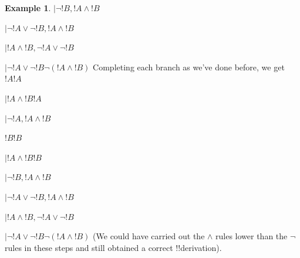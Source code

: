 \documentclass[10pt,a4paper]{article}
\theoremstyle{plain}
\theoremstyle{definition}
\newtheorem{ex}[thm]{Example}
\theoremstyle{remark}
\providecommand{\AxiomC}[1]{}
\providecommand{\RightLabel}[1]{}
\providecommand{\fCenter}{}
\newenvironment{prooftree}{}{}
\providecommand{\LeftR}[1]{}
\providecommand{\RightR}[1]{}
\providecommand{\UnaryInf}{\ensuremath{\mid}}
\providecommand{\BinaryInf}{\ensuremath{\mid}}
\providecommand{\RightR}{\mathrm{R}}
\providecommand{\LeftR}{\mathrm{L}}
\providecommand{\Axiom}{\mathrm{Ax}}
\begin{document}
\begin{ex}
\begin{prooftree}
\AxiomC{}
\UnaryInf$\lnot !B, !A \land !B \fCenter $

\RightLabel{\LeftR{\lor}}
\BinaryInf$\lnot !A \lor \lnot !B, !A \land !B \fCenter $
\RightLabel{\LeftR{\Exchange}}
\UnaryInf$!A \land !B, \lnot !A \lor \lnot !B \fCenter $
\RightLabel{\RightR{\lnot}}
\UnaryInf$\lnot !A \lor \lnot !B \fCenter \lnot (!A \land !B)$
\end{prooftree}
Completing each branch as we've done before, we get
\begin{prooftree}
\Axiom$ !A \fCenter!A$
\RightLabel{\LeftR{\land}}
\UnaryInf$!A \land !B \fCenter !A$
\RightLabel{\LeftR{\lnot}}
\UnaryInf$\lnot !A, !A \land !B \fCenter $

\Axiom$ !B \fCenter !B$
\RightLabel{\LeftR{\land}}
\UnaryInf$!A \land !B \fCenter !B$
\RightLabel{\LeftR{\lnot}}
\UnaryInf$\lnot !B, !A \land !B \fCenter $

\RightLabel{\LeftR{\lor}}
\BinaryInf$\lnot !A \lor \lnot !B, !A \land !B \fCenter $
\RightLabel{\LeftR{\Exchange}}
\UnaryInf$!A \land !B, \lnot !A \lor \lnot !B \fCenter $
\RightLabel{\RightR{\lnot}}
\UnaryInf$\lnot !A \lor \lnot !B \fCenter \lnot (!A \land !B)$
\end{prooftree}
(We could have carried out the $\land$ rules lower than the $\lnot$
rules in these steps and still obtained a correct !!{derivation}).
\end{ex}
\end{document}
